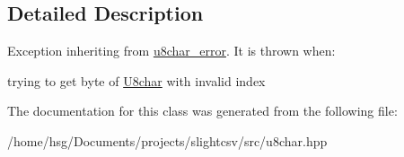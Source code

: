 \subsection{Detailed Description}
Exception inheriting from \hyperlink{classutils_1_1u8char__error}{u8char\+\_\+error}. It is thrown when\+:
\begin{DoxyItemize}
\item trying to get byte of \hyperlink{classutils_1_1U8char}{U8char} with invalid index 
\end{DoxyItemize}

The documentation for this class was generated from the following file\+:\begin{DoxyCompactItemize}
\item 
/home/hsg/\+Documents/projects/slightcsv/src/u8char.\+hpp\end{DoxyCompactItemize}
